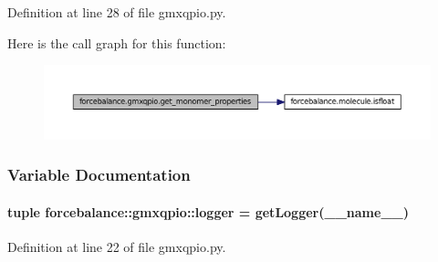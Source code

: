 \-Definition at line 28 of file gmxqpio.\-py.



\-Here is the call graph for this function\-:
\nopagebreak
\begin{figure}[H]
\begin{center}
\leavevmode
\includegraphics[width=350pt]{namespaceforcebalance_1_1gmxqpio_a499ed366638eae7be524b18760a986b8_cgraph}
\end{center}
\end{figure}




\subsubsection{\-Variable \-Documentation}
\hypertarget{namespaceforcebalance_1_1gmxqpio_acda091f5560133153442032d0f732f52}{
\paragraph[{logger}]{\setlength{\rightskip}{0pt plus 5cm}tuple {\bf forcebalance\-::gmxqpio\-::logger} = get\-Logger(\-\_\-\-\_\-name\-\_\-\-\_\-)}}\label{namespaceforcebalance_1_1gmxqpio_acda091f5560133153442032d0f732f52}


\-Definition at line 22 of file gmxqpio.\-py.

